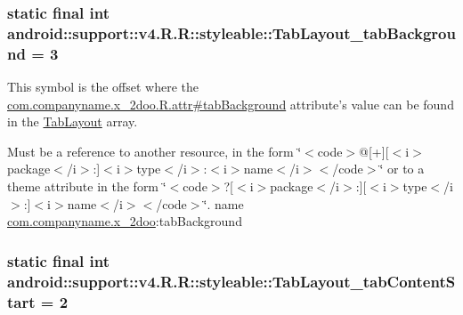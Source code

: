 \hypertarget{classandroid_1_1support_1_1v4_1_1_r_1_1styleable_675e2f29080457fa431fc68be4479b4f}{
\subsubsection[{TabLayout\_\-tabBackground}]{\setlength{\rightskip}{0pt plus 5cm}static final int android::support::v4.R.R::styleable::TabLayout\_\-tabBackground = 3}}
\label{classandroid_1_1support_1_1v4_1_1_r_1_1styleable_675e2f29080457fa431fc68be4479b4f}


This symbol is the offset where the \hyperlink{classcom_1_1companyname_1_1x__2doo_1_1_r_1_1attr_4946a58267e3e442f79aca572d995400}{com.companyname.x\_\-2doo.R.attr\#tabBackground} attribute's value can be found in the \hyperlink{classandroid_1_1support_1_1v4_1_1_r_1_1styleable_d1f1104cdc4fac0ab4797d48f7efe351}{TabLayout} array.

Must be a reference to another resource, in the form \char`\"{}$<$code$>$@\mbox{[}+\mbox{]}\mbox{[}$<$i$>$package$<$/i$>$:\mbox{]}$<$i$>$type$<$/i$>$:$<$i$>$name$<$/i$>$$<$/code$>$\char`\"{} or to a theme attribute in the form \char`\"{}$<$code$>$?\mbox{[}$<$i$>$package$<$/i$>$:\mbox{]}\mbox{[}$<$i$>$type$<$/i$>$:\mbox{]}$<$i$>$name$<$/i$>$$<$/code$>$\char`\"{}.  name \hyperlink{namespacecom_1_1companyname_1_1x__2doo}{com.companyname.x\_\-2doo}:tabBackground \hypertarget{classandroid_1_1support_1_1v4_1_1_r_1_1styleable_df711e29dcdb60bbd96c539283d0f4f1}{
\subsubsection[{TabLayout\_\-tabContentStart}]{\setlength{\rightskip}{0pt plus 5cm}static final int android::support::v4.R.R::styleable::TabLayout\_\-tabContentStart = 2}}
\label{classandroid_1_1support_1_1v4_1_1_r_1_1styleable_df711e29dcdb60bbd96c539283d0f4f1}


